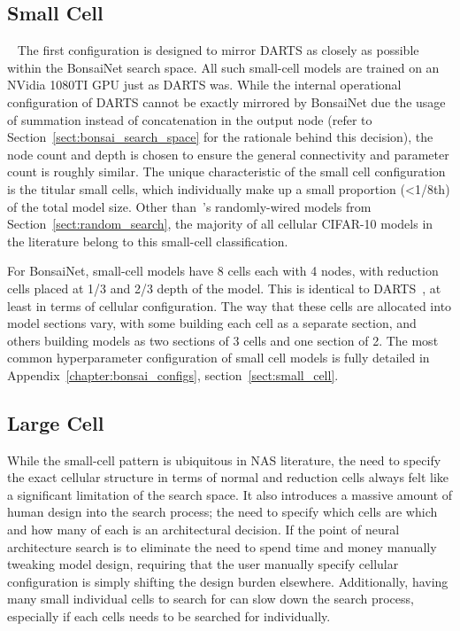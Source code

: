 \subsection{Small Cell}~\label{sect:small_cell_introduction}
The first configuration is designed to mirror DARTS as closely as
possible within the BonsaiNet search space. All such small-cell models are trained on an NVidia 1080TI GPU just as DARTS was. While the internal
operational configuration of DARTS cannot be exactly mirrored
by BonsaiNet due the usage of summation instead of concatenation in the output node (refer to Section~\ref{sect:bonsai_search_space} for
the rationale behind this decision), the node count and depth is chosen
to ensure the general connectivity and parameter count is roughly similar. The unique characteristic of the small
cell configuration is the titular small cells, which individually make up a small proportion (<1/8th) of the
total model size. Other than~\citeauthor{xi2019}'s randomly-wired models from Section~\ref{sect:random_search}, the majority of all cellular CIFAR-10 models
in the literature belong to this small-cell classification.

For BonsaiNet, small-cell models have 8 cells each with 4 nodes, with reduction cells placed at 1/3 and 2/3 depth of
the model. This is identical to DARTS~\citep{liu2018},
at least in terms of cellular configuration. The way that these cells are allocated into model sections vary, with some building
each cell as a separate section, and others building models as two sections of 3 cells and one section of 2.
The most common hyperparameter configuration of small cell models is
fully detailed in Appendix~\ref{chapter:bonsai_configs}, section~\ref{sect:small_cell}.

\subsection{Large Cell}
While the small-cell pattern is ubiquitous in NAS literature, the need to specify the exact cellular structure in terms
of normal and reduction cells always felt like a significant limitation of the search space. It also introduces a massive
amount of human design into the search process; the need to specify which cells are which and how many of each is an
architectural decision. If the point of neural architecture search is to eliminate the need to spend time and money
manually tweaking model design, requiring that the user manually specify cellular configuration is simply shifting
the design burden elsewhere. Additionally, having many small individual cells to search for can slow down the
search process, especially if each cells needs to be searched for individually.

